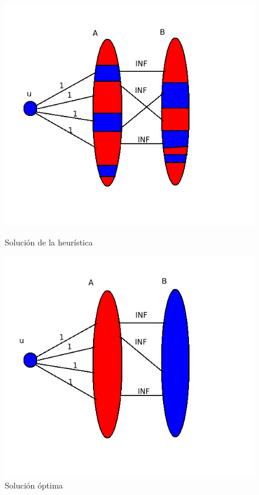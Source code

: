 \documentclass[11pt, a4paper, twoside]{article}
\begin{document}
\begin{enumerate}
		\begin{figure}[H]
		\begin{minipage}{.6\textwidth}
		\centering
		\includegraphics[width=.8\linewidth]{imagenes/ej3_21}
		\caption{Solución de la heurística}
		\end{minipage}
		\begin{minipage}{.6\textwidth}
		\includegraphics[width=.8\linewidth]{imagenes/ej3_22}
		\caption{Solución óptima}
		\end{minipage}
		\end{figure}
		

\end{enumerate}
\end{document}
